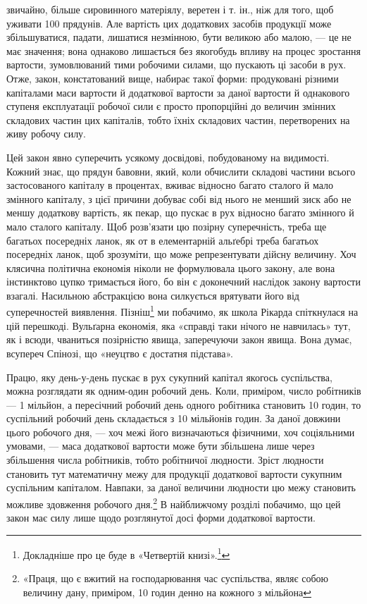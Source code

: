 \parcont{}  %
звичайно, більше сировинного матеріялу, веретен і т. ін., ніж
для того, щоб уживати 100 прядунів. Але вартість цих додаткових
засобів продукції може збільшуватися, падати, лишатися незмінною,
бути великою або малою, — це не має значення; вона однаково
лишається без якогобудь впливу на процес зростання вартости,
зумовлюваний тими робочими силами, що пускають ці
засоби в рух. Отже, закон, констатований вище, набирає такої
форми: продуковані різними капіталами маси вартости й додаткової
вартости за даної вартости й однакового ступеня експлуатації
робочої сили є просто пропорційні до величин змінних складових
частин цих капіталів, тобто їхніх складових частин, перетворених
на живу робочу силу.

Цей закон явно суперечить усякому досвідові, побудованому
на видимості. Кожний знає, що прядун бавовни, який, коли
обчислити складові частини всього застосованого капіталу в процентах,
вживає відносно багато сталого й мало змінного капіталу,
з цієї причини добуває собі від нього не менший зиск або не меншу
додаткову вартість, як пекар, що пускає в рух відносно багато
змінного й мало сталого капіталу. Щоб розв’язати цю позірну
суперечність, треба ще багатьох посередніх ланок, як от в елементарній
альґебрі треба багатьох посередніх ланок, щоб зрозуміти,
що  може репрезентувати дійсну величину. Хоч клясична політична
економія ніколи не формулювала цього закону, але вона
інстинктово цупко тримається його, бо він є доконечний наслідок
закону вартости взагалі. Насильною абстракцією вона силкується
врятувати його від суперечностей виявлення. Пізніш\footnote{
Докладніше про це буде в «Четвертій книзі».\footnote*{
Мова йде про «Теорії додаткової вартости», що їх Маркс мав на
думці видати як «Четверту книгу Капіталу». \emph{Ред.}
}
}
ми побачимо, як школа Рікарда спіткнулася на цій перешкоді.
Вульґарна економія, яка «справді таки нічого не навчилась»
тут, як і всюди, чваниться позірністю явища, заперечуючи закон
явища. Вона думає, всупереч Спінозі, що «неуцтво є достатня
підстава».

Працю, яку день-у-день пускає в рух сукупний капітал
якогось суспільства, можна розглядати як одним-один робочий
день. Коли, приміром, число робітників — 1 мільйон, а пересічний
робочий день одного робітника становить 10 годин, то суспільний
робочий день складається з 10 мільйонів годин. За даної
довжини цього робочого дня, — хоч межі його визначаються фізичними,
хоч соціяльними умовами, — маса додаткової вартости може
бути збільшена лише через збільшення числа робітників, тобто
робітничої людности. Зріст людности становить тут математичну
межу для продукції додаткової вартости сукупним суспільним
капіталом. Навпаки, за даної величини людности цю межу становить
можливе здовження робочого дня.\footnote{
«Праця, що є вжитий на господарювання час суспільства, являє
собою величину дану, приміром, 10 годин денно на кожного з мільйона
} В найближчому розділі
побачимо, що цей закон має силу лише щодо розглянутої досі
форми додаткової вартости.

